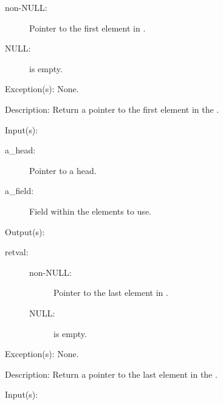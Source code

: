 \begin{capi}
\begin{capilist}
\begin{description}
			\begin{description}\item[]
			\item[non-NULL: ]
				Pointer to the first element in .
			\item[NULL: ]
				 is empty.
			\end{description}
		\end{description}
	\item[Exception(s): ] None.
	\item[Description: ]
		Return a pointer to the first element in the .
	\end{capilist}
\label{ql_last}
	\begin{capilist}
	\item[Input(s): ]
		\begin{description}\item[]
		\item[a\_head: ]
			Pointer to a  head.
		\item[a\_field: ]
			Field within the  elements to use.
		\end{description}
	\item[Output(s): ]
		\begin{description}\item[]
		\item[retval: ]
			\begin{description}\item[]
			\item[non-NULL: ]
				Pointer to the last element in .
			\item[NULL: ]
				 is empty.
			\end{description}
		\end{description}
	\item[Exception(s): ] None.
	\item[Description: ]
		Return a pointer to the last element in the .
	\end{capilist}
\label{ql_next}
	\begin{capilist}
	\item[Input(s): ]
		\begin{description}\item[]

\end{description}
\end{capilist}
\end{capi}
